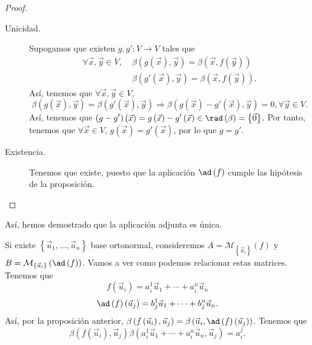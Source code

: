 \begin{proof}
\begin{description}
\item[Unicidad.] Supogamos que existen $\displaystyle g,g' : V \to V $ tales que 
	\[
	\begin{split}
		\forall \vec{x}, \vec{y} \in V, \; & \beta\left(g\left(\vec{x}\right), \vec{y}\right) = \beta\left(\vec{x}, f\left(\vec{y}\right)\right) \\
						   & \beta\left(g'\left(\vec{x}\right), \vec{y}\right)=\beta\left(\vec{x}, f\left(\vec{y}\right)\right).
	\end{split}
	\]
	Así, tenemos que $\displaystyle \forall \vec{x}, \vec{y} \in V $,
	\[ \beta\left(g\left(\vec{x}\right), \vec{y} \right) = \beta\left(g'\left(\vec{x}\right), \vec{y}\right) \Rightarrow \beta\left(g\left(\vec{x}\right)-g'\left(\vec{x}\right), \vec{y}\right) = 0, \forall \vec{y} \in V .\]
	Así, tenemos que $\displaystyle \left(g-g'\right)\left(\vec{x}\right) = g\left(\vec{x}\right)-g'\left(\vec{x}\right) \in \rad\left(\beta \right)= \left\{ \vec{0}\right\}  $. Por tanto, tenemos que $\displaystyle \forall \vec{x} \in V $, $\displaystyle g\left(\vec{x}\right) = g'\left(\vec{x}\right) $, por lo que $\displaystyle g = g' $.
\item[Existencia.] Tenemos que existe, puesto que la aplicación $\displaystyle \ad\left(f\right) $ cumple las hipótesis de la proposición.
\end{description}
\end{proof}
\begin{observation}
\normalfont Así, hemos demostrado que la aplicación adjunta es única.
\end{observation}
Si existe $\displaystyle \left\{ \vec{u}_{1}, \ldots, \vec{u}_{n}\right\}  $ base ortonormal, consideremos $\displaystyle A = \mathcal{M}_{ \left\{ \vec{u}_{i}\right\} }\left(f\right) $ y $\displaystyle B = \mathcal{M}_{ \left\{ \vec{u}_{i}\right\} }\left(\ad\left(f\right)\right) $. Vamos a ver como podemos relacionar estas matrices. Tenemos que
\[f\left(\vec{u}_{i}\right) = a^{1}_{i}\vec{u}_{1} + \cdots + a^{n}_{i}\vec{u}_{n} \]
\[ \ad\left(f\right)\left(\vec{u}_{j}\right) = b^{1}_{j}\vec{u}_{1} + \cdots + b^{n}_{j}\vec{u}_{n} .\]
Así, por la proposición anterior, $\displaystyle \beta\left(f\left(\vec{u}_{i}\right), \vec{u}_{j}\right) = \beta\left(\vec{u}_{i}, \ad\left(f\right)\left(\vec{u}_{j}\right)\right) $. Tenemos que
\[ \beta\left(f\left(\vec{u}_{i}\right),\vec{u}_{j}\right)\beta\left(a^{1}_{i}\vec{u}_{1} + \cdots + a^{n}_{i}\vec{u}_{n}, \vec{u}_{j}\right) =a^{j}_{i} .\]
